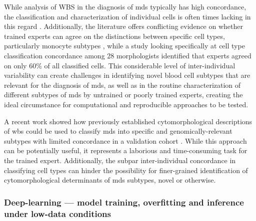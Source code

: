 While analysis of WBS in the diagnosis of \ac{mds} typically has high concordance, the classification and characterization of individual cells is often times lacking in this regard \cite{De_Swart2017-wc,Howe2004-mn}. Additionally, the literature offers conflicting evidence on whether trained experts can agree on the distinctions between specific cell types, particularly monocyte subtypes \cite{Goasguen2009-dn,Foucar2020-uz}, while a study looking specifically at cell type classification concordance among 28 morphologists identified that experts agreed on only 60\% of all classified cells. This considerable level of inter-individual variability can create challenges in identifying novel blood cell subtypes that are relevant for the diagnosis of \ac{mds}, as well as in the routine characterization of different subtypes of \ac{mds} by untrained or poorly trained experts, creating the ideal circumstance for computational and reproducible approaches to be tested.

A recent work showed how previously established cytomorphological descriptions of \ac{wbs} could be used to classify \ac{mds} into specific and genomically-relevant subtypes with limited concordance in a validation cohort \cite{Nagata2020-lh}. While this approach can be potentially useful, it represents a laborious and time-consuming task for the trained expert. Additionally, the subpar inter-individual concordance in classifying cell types can hinder the possibility for finer-grained identification of cytomorphological determinants of \ac{mds} subtypes, novel or otherwise. 

\subsubsection{Deep-learning --- model training, overfitting and inference under low-data conditions}

